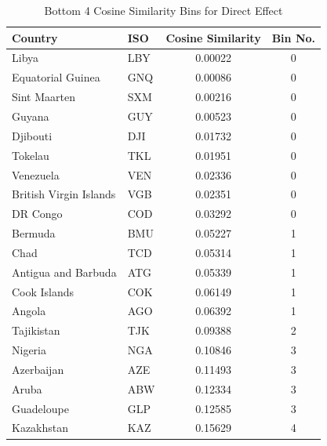 \begin{table}[htbp]
\centering
\caption{Bottom 4 Cosine Similarity Bins for Direct Effect}
\label{tab:bottom_cosine_similarity_bins_direct_sim}
\begin{tabular}{llcc}
\toprule
Country & ISO & Cosine Similarity & Bin No. \\
\midrule
Libya & LBY &  0.00022 & 0 \\
Equatorial Guinea & GNQ &  0.00086 & 0 \\
Sint Maarten & SXM &  0.00216 & 0 \\
Guyana & GUY &  0.00523 & 0 \\
Djibouti & DJI &  0.01732 & 0 \\
Tokelau & TKL &  0.01951 & 0 \\
Venezuela & VEN &  0.02336 & 0 \\
British Virgin Islands & VGB &  0.02351 & 0 \\
DR Congo & COD &  0.03292 & 0 \\
Bermuda & BMU &  0.05227 & 1 \\
Chad & TCD &  0.05314 & 1 \\
Antigua and Barbuda & ATG &  0.05339 & 1 \\
Cook Islands & COK &  0.06149 & 1 \\
Angola & AGO &  0.06392 & 1 \\
Tajikistan & TJK &  0.09388 & 2 \\
Nigeria & NGA &  0.10846 & 3 \\
Azerbaijan & AZE &  0.11493 & 3 \\
Aruba & ABW &  0.12334 & 3 \\
Guadeloupe & GLP &  0.12585 & 3 \\
Kazakhstan & KAZ &  0.15629 & 4 \\
\bottomrule
\end{tabular}
\end{table}
